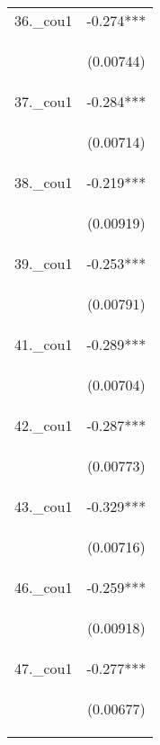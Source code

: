 \documentclass[]{article}
\begin{document}
\begin{center}
\begin{tabular}{lc}
36.\_cou1 & -0.274*** \\
\vspace{4pt} & \begin{footnotesize}(0.00744)\end{footnotesize} \\
37.\_cou1 & -0.284*** \\
\vspace{4pt} & \begin{footnotesize}(0.00714)\end{footnotesize} \\
38.\_cou1 & -0.219*** \\
\vspace{4pt} & \begin{footnotesize}(0.00919)\end{footnotesize} \\
39.\_cou1 & -0.253*** \\
\vspace{4pt} & \begin{footnotesize}(0.00791)\end{footnotesize} \\
41.\_cou1 & -0.289*** \\
\vspace{4pt} & \begin{footnotesize}(0.00704)\end{footnotesize} \\
42.\_cou1 & -0.287*** \\
\vspace{4pt} & \begin{footnotesize}(0.00773)\end{footnotesize} \\
43.\_cou1 & -0.329*** \\
\vspace{4pt} & \begin{footnotesize}(0.00716)\end{footnotesize} \\
46.\_cou1 & -0.259*** \\
\vspace{4pt} & \begin{footnotesize}(0.00918)\end{footnotesize} \\
47.\_cou1 & -0.277*** \\
\vspace{4pt} & \begin{footnotesize}(0.00677)\end{footnotesize} \\

\end{tabular}
\end{center}
\end{document}
